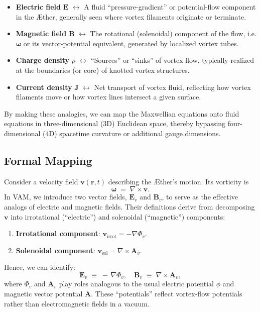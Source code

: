 \documentclass[aps,preprint,superscriptaddress]{revtex4-2}
\begin{document}
    \begin{itemize}
        \item \textbf{Electric field} \(\mathbf{E}\) \(\longleftrightarrow\) A fluid “pressure-gradient” or potential-flow component in the Æther, generally seen where vortex filaments originate or terminate.
        \item \textbf{Magnetic field} \(\mathbf{B}\) \(\longleftrightarrow\) The rotational (solenoidal) component of the flow, i.e. \(\boldsymbol{\omega}\) or its vector-potential equivalent, generated by localized vortex tubes.
        \item \textbf{Charge density} \(\rho\) \(\longleftrightarrow\) “Sources” or “sinks” of vortex flow, typically realized at the boundaries (or core) of knotted vortex structures.
        \item \textbf{Current density} \(\mathbf{J}\) \(\longleftrightarrow\) Net transport of vortex fluid, reflecting how vortex filaments move or how vortex lines intersect a given surface.
    \end{itemize}

    By making these analogies, we can map the Maxwellian equations onto fluid equations in three-dimensional (3D) Euclidean space, thereby bypassing four-dimensional (4D) spacetime curvature or additional gauge dimensions.

    \subsection{Formal Mapping}

    Consider a velocity field \(\mathbf{v}(\mathbf{r},t)\) describing the Æther’s motion. Its vorticity is
    \[
        \boldsymbol{\omega} \;=\; \nabla \times \mathbf{v}.
    \]
    In VAM, we introduce two vector fields, \(\mathbf{E}_v\) and \(\mathbf{B}_v\), to serve as the effective analogs of electric and magnetic fields. Their definitions derive from decomposing \(\mathbf{v}\) into irrotational (“electric”) and solenoidal (“magnetic”) components:

    \begin{enumerate}
        \item \textbf{Irrotational component}: \(\mathbf{v}_{\mathrm{irrot}} = -\nabla \Phi_v\).
        \item \textbf{Solenoidal component}: \(\mathbf{v}_{\mathrm{sol}} = \nabla \times \mathbf{A}_v\).
    \end{enumerate}

    Hence, we can identify:
    \[
        \mathbf{E}_v \;\equiv\; -\,\nabla\Phi_v,
        \quad
        \mathbf{B}_v \;\equiv\; \nabla \times \mathbf{A}_v,
    \]
    where \(\Phi_v\) and \(\mathbf{A}_v\) play roles analogous to the usual electric potential \(\phi\) and magnetic vector potential \(\mathbf{A}\). These “potentials” reflect vortex-flow potentials rather than electromagnetic fields in a vacuum.
\end{document}

